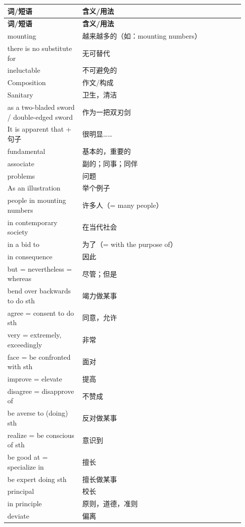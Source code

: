 \begin{longtable}{|>{\raggedright\arraybackslash}p{0.3\linewidth}|>{\raggedright\arraybackslash}p{0.65\linewidth}|}
\hline
\textbf{词/短语} & \textbf{含义/用法} \\
\hline
\endfirsthead
\hline
\textbf{词/短语} & \textbf{含义/用法} \\
\hline
\endhead
\hline
\endfoot

mounting & 越来越多的（如：mounting numbers） \\
there is no substitute for & 无可替代 \\
ineluctable & 不可避免的 \\
Composition & 作文/构成 \\
Sanitary & 卫生，清洁 \\
as a two-bladed sword / double-edged sword & 作为一把双刃剑 \\
It is apparent that + 句子 & 很明显…… \\
fundamental & 基本的，重要的 \\
associate & 副的；同事；同伴 \\
problems & 问题 \\
As an illustration & 举个例子 \\
people in mounting numbers & 许多人（= many people） \\
in contemporary society & 在当代社会 \\
in a bid to & 为了（= with the purpose of） \\
in consequence & 因此 \\
but = nevertheless = whereas & 尽管；但是 \\
bend over backwards to do sth & 竭力做某事 \\
agree = consent to do sth & 同意，允许 \\
very = extremely, exceedingly & 非常 \\
face = be confronted with sth & 面对 \\
improve = elevate & 提高 \\
disagree = disapprove of & 不赞成 \\
be averse to (doing) sth & 反对做某事 \\
realize = be conscious of sth & 意识到 \\
be good at = specialize in & 擅长 \\
be expert doing sth & 擅长做某事 \\
principal & 校长 \\
in principle & 原则，道德，准则 \\
deviate & 偏离 \\
\hline
\end{longtable}